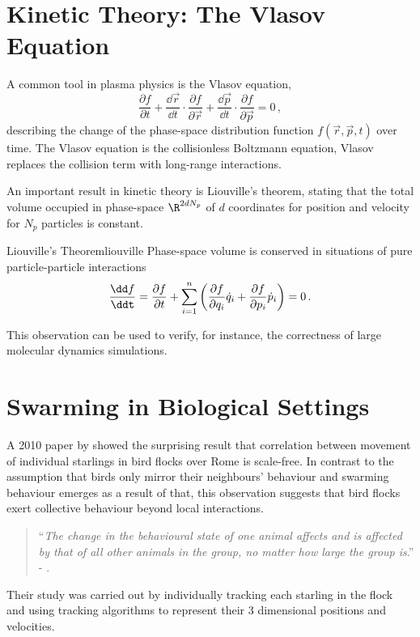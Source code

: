 \section{Kinetic Theory: The Vlasov Equation}
A common tool in plasma physics is the Vlasov equation,
$$\frac{\partial f}{\partial t}+{\frac {\dd \vec{r} }{\dd t}}\cdot {\frac {\partial f}{\partial \vec{r} }}+{\frac {\dd \vec{p} }{\dd t}}\cdot {\frac {\partial f}{\partial \vec{p} }}=0\,,$$
describing the change of the phase-space distribution function $f(\vec{r}, \vec{p}, t)$ over time.
The Vlasov equation is the collisionless Boltzmann equation, Vlasov replaces the collision term with long-range interactions.

An important result in kinetic theory is Liouville's theorem, stating that the total volume occupied in phase-space $\R^{2dN_p}$ of $d$ coordinates for position and velocity for $N_p$ particles is constant.

\begin{theorem}{Liouville's Theorem}{liouville}
  Phase-space volume is conserved in situations of pure particle-particle interactions
  $$\frac{\dd f}{\ddt}=
    \frac{\partial f}{\partial t}
    +\sum_{i=1}^n\left(\frac{\partial f}{\partial q_i}\dot{q}_i
    +\frac{\partial f}{\partial p_i}\dot{p}_i\right)=0\,.$$
\end{theorem}

This observation can be used to verify, for instance, the correctness of large molecular dynamics simulations.

\section{Swarming in Biological Settings}
A 2010 paper by \citeauthor{2010-starlings} showed the surprising result that correlation between movement of individual starlings in bird flocks over Rome is scale-free.
In contrast to the assumption that birds only mirror their neighbours' behaviour and swarming behaviour emerges as a result of that, this observation suggests that bird flocks exert collective behaviour beyond local interactions.
\begin{quote}
  ``\textit{The change in the behavioural state of one animal affects and is affected by that of all other animals in the group, no matter how large the group is}.'' - \cite{2010-starlings}.
\end{quote}
Their study was carried out by individually tracking each starling in the flock and using tracking algorithms to represent their 3 dimensional positions and velocities.

